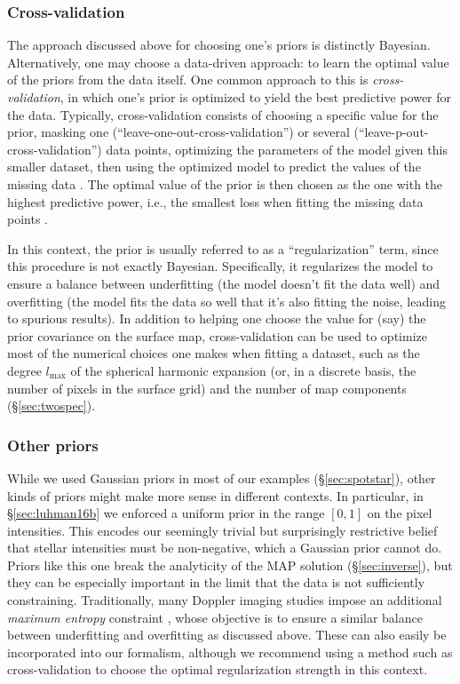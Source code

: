 \documentclass[modern]{aastex631}
\begin{document}
\subsubsection{Cross-validation}
\label{sec:discussion:priors:crossval}
%
The approach discussed above for choosing one's priors is distinctly Bayesian.
Alternatively, one may choose a data-driven approach: to learn the optimal value of the priors from the data itself.
One common approach to this is \emph{cross-validation}, in which one's prior is optimized to yield the best predictive power for the data.
Typically, cross-validation consists of choosing a specific value for the prior, masking one (``leave-one-out-cross-validation'') or several (``leave-p-out-cross-validation'') data points, optimizing the parameters of the model given this smaller dataset, then using the optimized model to predict the values of the missing data \citep[e.g.,][]{Stone1974}.
The optimal value of the prior is then chosen as the one with the highest predictive power, i.e., the smallest loss when fitting the missing data points \citep[for an example of this, see \S 3.7 in][]{Luger2018}.

In this context, the prior is usually referred to as a ``regularization'' term, since this procedure is not exactly Bayesian. 
Specifically, it regularizes the model to ensure a balance between underfitting (the model doesn't fit the data well) and overfitting (the model fits the data so well that it's also fitting the noise, leading to spurious results).
In addition to helping one choose the value for (say) the prior covariance on the surface map, cross-validation can be used to optimize most of the numerical choices one makes when fitting a dataset, such as the degree $l_\mathrm{max}$ of the spherical harmonic expansion (or, in a discrete basis, the number of pixels in the surface grid) and the number of map components (\S\ref{sec:twospec}).

\subsubsection{Other priors}
\label{sec:discussion:priors:nongaussian}

While we used Gaussian priors in most of our examples (\S\ref{sec:spotstar}), other kinds of priors might make more sense in different contexts. 
In particular, in \S\ref{sec:luhman16b} we enforced a uniform prior in the range $[0, 1]$ on the pixel intensities. 
This encodes our seemingly trivial but surprisingly restrictive \citep[see][]{Fienup1982} belief that stellar intensities must be non-negative, which a Gaussian prior cannot do.
Priors like this one break the analyticity of the MAP solution (\S\ref{sec:inverse}), but they can be especially important in the limit that the data is not sufficiently constraining.
Traditionally, many Doppler imaging studies impose an additional \emph{maximum entropy} constraint \citep{Vogt1987}, whose objective is to ensure a similar balance between underfitting and overfitting as discussed above.
These can also easily be incorporated into our formalism, although we recommend using a method such as cross-validation to choose the optimal regularization strength in this context.
\end{document}
